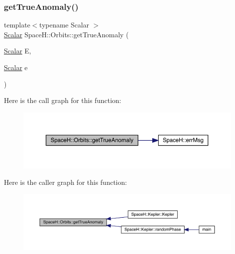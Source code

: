 \subsubsection{\texorpdfstring{get\+True\+Anomaly()}{calcuTrueAnomaly()}}
{\footnotesize\ttfamily template$<$typename Scalar $>$ \\
\mbox{\hyperlink{create_kepler_8cpp_a8c2981f3f834be9448a6ab06c28748eb}{Scalar}} Space\+H\+::\+Orbits\+::get\+True\+Anomaly (\begin{DoxyParamCaption}\item[{\mbox{\hyperlink{create_kepler_8cpp_a8c2981f3f834be9448a6ab06c28748eb}{Scalar}}}]{E,  }\item[{\mbox{\hyperlink{create_kepler_8cpp_a8c2981f3f834be9448a6ab06c28748eb}{Scalar}}}]{e }\end{DoxyParamCaption})}

Here is the call graph for this function\+:
\nopagebreak
\begin{figure}[H]
\begin{center}
\leavevmode
\includegraphics[width=350pt]{namespace_space_h_1_1_orbits_a43d1a07ed25eaf775f3a83d7000a2596_cgraph}
\end{center}
\end{figure}
Here is the caller graph for this function\+:
\nopagebreak
\begin{figure}[H]
\begin{center}
\leavevmode
\includegraphics[width=350pt]{namespace_space_h_1_1_orbits_a43d1a07ed25eaf775f3a83d7000a2596_icgraph}
\end{center}
\end{figure}
\mbox{\label{namespace_space_h_1_1_orbits_a678a54bbf3a8637d6437b4b8b4a39d97}} 
